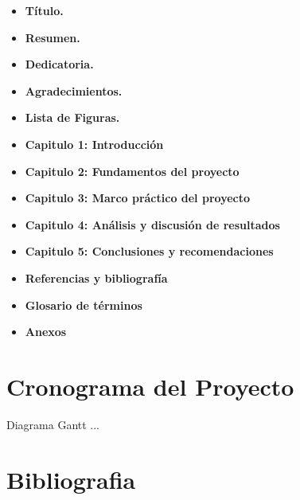 \documentclass[12pt,letterpaper]{article}
\begin{document}
\begin{itemize}

\item \textbf{Título.}

\item \textbf{Resumen.}

\item \textbf{Dedicatoria.}

\item \textbf{Agradecimientos.}

\item \textbf{Lista de Figuras.}

\item \textbf{Capitulo 1: Introducción}  

\item \textbf{Capitulo 2: Fundamentos del proyecto}  

\item \textbf{Capitulo 3: Marco práctico del proyecto} 

\item \textbf{Capitulo 4: Análisis y discusión de resultados}

\item \textbf{Capitulo 5: Conclusiones y recomendaciones}
\item \textbf{Referencias y bibliografía}

\item \textbf{Glosario de términos}

\item \textbf{Anexos}
\end{itemize}

 
\section{Cronograma del Proyecto}

Diagrama Gantt ...




\section{Bibliografia}







\end{document}
